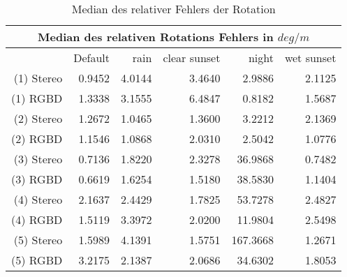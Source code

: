 \begin{table}
  \centering
    \begin{tabular}{r|r|r|r|r|r}
      \toprule %
      \multicolumn{6}{c}{Median des relativen Rotations Fehlers in $deg/m$} \\
      \midrule %
      \phantom{abc} & Default & rain& clear sunset & night & wet sunset\\
      \midrule %
      (1) Stereo & 0.9452 & 4.0144 & 3.4640 & 2.9886& 2.1125\\
      \rowcolor{LightGray}
      (1) RGBD & 1.3338 & 3.1555 & 6.4847 &  0.8182& 1.5687\\
      (2) Stereo & 1.2672 & 1.0465 & 1.3600 & 3.2212& 2.1369\\
      \rowcolor{LightGray}
      (2) RGBD & 1.1546 & 1.0868 & 2.0310 &  2.5042& 1.0776\\
      (3) Stereo & 0.7136 & 1.8220 & 2.3278 & 36.9868& 0.7482\\
      \rowcolor{LightGray}
      (3) RGBD & 0.6619 &  1.6254 & 1.5180 & 38.5830& 1.1404\\
      (4) Stereo & 2.1637 &  2.4429 & 1.7825 & 53.7278& 2.4827\\
      \rowcolor{LightGray}
      (4) RGBD & 1.5119 &  3.3972 & 2.0200 & 11.9804& 2.5498\\
      (5) Stereo & 1.5989 & 4.1391 & 1.5751 & 167.3668& 1.2671\\
      \rowcolor{LightGray}
      (5) RGBD & 3.2175 & 2.1387 & 2.0686 & 34.6302&  1.8053\\	
      \bottomrule %
    \end{tabular}
  \caption{Median des relativer Fehlers der Rotation}
  \end{table} 	
